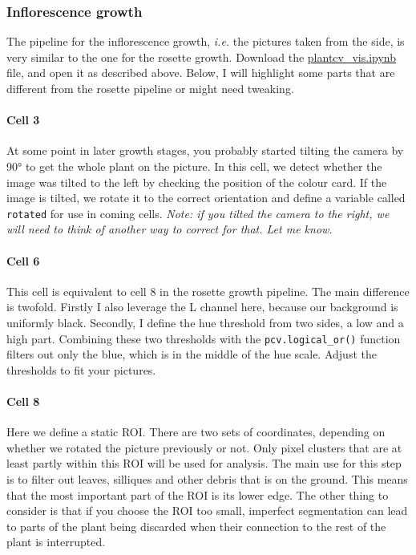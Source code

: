 \documentclass[10pt]{article}
\begin{document}
\subsubsection{Inflorescence growth}

The pipeline for the inflorescence growth, \textit{i.e.} the pictures taken from the side, is very similar to the one for the rosette growth. Download the \href{https://github.com/leonardblaschek/plantcv/blob/06e4e001111b82e5dbaff17217257d8c75d22bbc/plantcv_vis.ipynb}{plantcv\_vis.ipynb} file, and open it as described above. Below, I will highlight some parts that are different from the rosette pipeline or might need tweaking.

\paragraph*{Cell 3} At some point in later growth stages, you probably started tilting the camera by 90° to get the whole plant on the picture. In this cell, we detect whether the image was tilted to the left by checking the position of the colour card. If the image is tilted, we rotate it to the correct orientation and define a variable called \texttt{rotated} for use in coming cells. \textit{Note: if you tilted the camera to the right, we will need to think of another way to correct for that. Let me know.}

\paragraph*{Cell 6} This cell is equivalent to cell 8 in the rosette growth pipeline. The main difference is twofold. Firstly I also leverage the L channel here, because our background is uniformly black. Secondly, I define the hue threshold from two sides, a low and a high part. Combining these two thresholds with the \texttt{pcv.logical\_or()} function filters out only the blue, which is in the middle of the hue scale. Adjust the thresholds to fit your pictures.

\paragraph*{Cell 8} Here we define a static ROI. There are two sets of coordinates, depending on whether we rotated the picture previously or not. Only pixel clusters that are at least partly within this ROI will be used for analysis. The main use for this step is to filter out leaves, silliques and other debris that is on the ground. This means that the most important part of the ROI is its lower edge. The other thing to consider is that if you choose the ROI too small, imperfect segmentation can lead to parts of the plant being discarded when their connection to the rest of the plant is interrupted.
\end{document}
